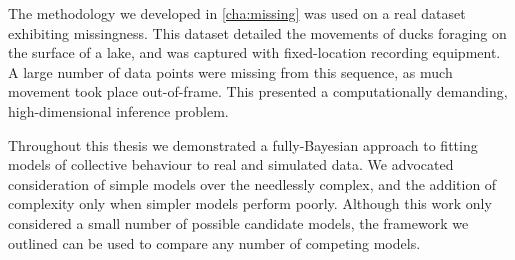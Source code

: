 The methodology we developed in \cref{cha:missing} was used on a real dataset
exhibiting missingness. This dataset detailed the movements of ducks
foraging on the surface of a lake, and was captured with fixed-location
recording equipment. A large number of data points were missing from this
sequence, as much movement took place out-of-frame. This presented a
computationally demanding, high-dimensional inference problem.

Throughout this thesis we demonstrated a fully-Bayesian approach to fitting
models of collective behaviour to real and simulated data. We advocated
consideration of simple models over the needlessly complex, and the addition of
complexity only when simpler models perform poorly. Although this work only
considered a small number of possible candidate models, the framework we
outlined can be used to compare any number of competing models.
